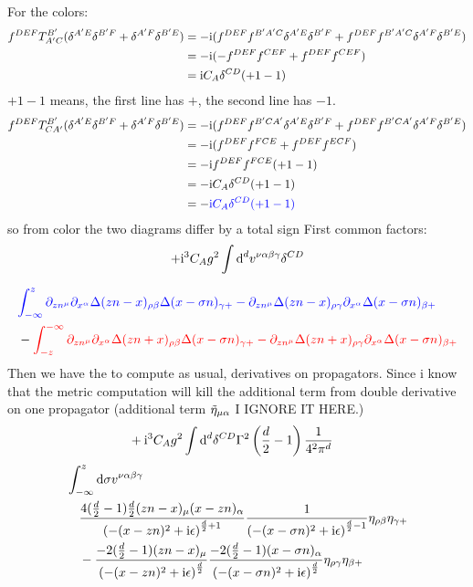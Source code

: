 For the colors:
{\color{blue}
\begin{align}
f^{DEF} T^{B'}_{A'C}(\delta^{A'E} \delta^{B'F} + \delta^{A'F} \delta^{B'E})
&=
-\text{i}(f^{DEF}f^{B'A'C}\delta^{A'E} \delta^{B'F} + f^{DEF}f^{B'A'C}\delta^{A'F} \delta^{B'E})
\\
&=
-\text{i}(-f^{DEF}f^{CEF} + f^{DEF}f^{CEF})
\\
&=
\text{i} C_A\delta^{CD}(+1 -1)
\end{align}
}
$+1-1$ means, the first line has $+$, the second line has $-1$.
 {\color{red}
\begin{align}
f^{DEF} T^{B'}_{CA'}(\delta^{A'E} \delta^{B'F} + \delta^{A'F} \delta^{B'E})
&=
-\text{i}(f^{DEF}f^{B'CA'}\delta^{A'E} \delta^{B'F} + f^{DEF}f^{B'CA'}\delta^{A'F} \delta^{B'E})
\\
&=
-\text{i}(f^{DEF}f^{FCE} + f^{DEF}f^{ECF})
\\
&=
-\text{i} f^{DEF}f^{FCE}(+1-1)
\\
&=
-\text{i} C_A\delta^{CD}(+1 -1)
\\
&=
-{\color{blue} \text{i} C_A\delta^{CD}(+1 -1)}
\end{align}
}
so from color the two diagrams differ by a total sign
First common factors:
\begin{align}
	+\text{i}^3 C_A g^2 \int \text{d} ^d  v^{\nu \alpha\beta\gamma}\delta^{CD}
\end{align}


\begin{align}
	&{\color{blue}\int_{-\infty}^{z}\partial_{zn^\mu} \partial_{x^\alpha} \Delta(zn-x)_{\rho \beta} \Delta(x-\sigma n)_{\gamma +} - \partial_{zn^\mu}\Delta(zn-x)_{\rho \gamma}\partial_{x^\alpha}  \Delta(x-\sigma n)_{\beta +}}
	\\
	&-{\color{red}\int_{-z}^{-\infty}\partial_{zn^\mu} \partial_{x^\alpha} \Delta(zn+x)_{\rho \beta} \Delta(x-\sigma n)_{\gamma +} - \partial_{zn^\mu}\Delta(zn+x)_{\rho \gamma}\partial_{x^\alpha}  \Delta(x-\sigma n)_{\beta +}}
\end{align}
Then we have the to compute as usual, derivatives on propagators. Since i know that the metric computation will kill the additional term from double derivative on one propagator (additional term $\tilde {\eta}_{\mu \alpha}$ I IGNORE IT HERE.)
\begin{align}
	&+\text{i}^3 C_A g^2 \int \text{d} ^d \delta^{CD}\Gamma^2\left(\frac{d}{2}-1\right)\frac{1}{4^2\pi^d}
\end{align}
{\color{blue}
\begin{align}
	&\int_{-\infty}^{z}\text{d} \sigma v^{\nu \alpha\beta\gamma}
	\\&~~~
	\frac{4(\frac{d}{2}-1)\frac{d}{2}(zn-x)_\mu(x-zn)_\alpha}{\left(-(x-zn)^2 + \text{i} \epsilon\right)^{\frac{d}{2}+1}} 
	\frac{1}{\left(-(x-\sigma n)^2 + \text{i} \epsilon\right)^{\frac{d}{2}-1}}\eta_{\rho \beta} \eta_{\gamma +} 
	\\&~~~
	- \frac{-2(\frac{d}{2}-1)(zn-x)_\mu}{\left( -(x-z n)^2 + \text{i} \epsilon \right)^{\frac{d}{2}}}\frac{-2(\frac{d}{2}-1)(x-\sigma n)_\alpha}{\left(-(x-\sigma n)^2 + \text{i} \epsilon\right)^{\frac{d}{2}}}
	\eta_{\rho \gamma}\eta_{\beta +}
\end{align}
}

